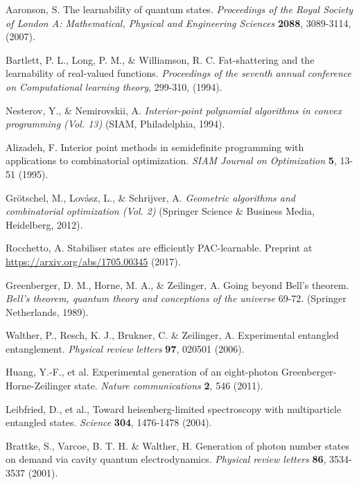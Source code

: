 \documentclass[aps,superscriptaddress,nofootinbib,twocolumn]{revtex4-1}
\begin{document}
\begin{thebibliography}{9}
 Aaronson, S.
The learnability of quantum states. 
\textit{Proceedings of the Royal Society of London A: Mathematical, Physical and Engineering Sciences} \textbf{2088}, 3089-3114, (2007).

 Bartlett, P. L., Long, P. M., \& Williamson, R. C.
Fat-shattering and the learnability of real-valued functions. 
\textit{Proceedings of the seventh annual conference on Computational learning theory}, 299-310, (1994).

 Nesterov, Y., \& Nemirovskii, A. 
\textit{Interior-point polynomial algorithms in convex programming (Vol. 13)} 
(SIAM, Philadelphia, 1994).

 Alizadeh, F.
Interior point methods in semidefinite programming with applications to combinatorial optimization.
\textit{SIAM Journal on Optimization} \textbf{5}, 13-51 (1995).

 Gr{\"o}tschel, M., Lov{\'a}sz, L., \& Schrijver, A. \textit{Geometric algorithms and combinatorial optimization (Vol. 2)}
(Springer Science \& Business Media, Heidelberg, 2012).

 Rocchetto, A. Stabiliser states are efficiently PAC-learnable. Preprint at \href{https://arxiv.org/abs/1705.00345}{https://arxiv.org/abs/1705.00345} (2017).

 Greenberger, D. M., Horne, M. A., \& Zeilinger, A. 
Going beyond Bell's theorem. 
\textit{Bell's theorem, quantum theory and conceptions of the universe} 69-72. (Springer Netherlands, 1989).

 Walther, P., Resch, K. J., Brukner, C. \& Zeilinger, A.
Experimental entangled entanglement.
\textit{Physical review letters} \textbf{97}, 020501 (2006).

 Huang, Y.-F., et al.
Experimental generation of an eight-photon Greenberger-Horne-Zeilinger state.
\textit{Nature communications} \textbf{2}, 546 (2011).

Leibfried, D., et al.,
Toward heisenberg-limited spectroscopy with multiparticle entangled states.
\textit{Science} \textbf{304}, 1476-1478 (2004).

Brattke, S., Varcoe, B. T. H.  \& Walther, H.
Generation of photon number states on demand via cavity quantum electrodynamics.
\textit{Physical review letters} \textbf{86}, 3534-3537 (2001).


\end{thebibliography}
\end{document}
